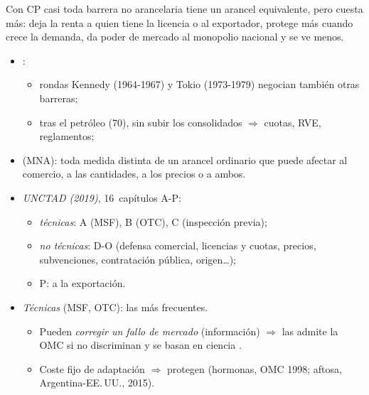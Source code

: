 \documentclass{article}
\begin{document}
\begin{columnas}
\begin{ideaclave}
Con CP casi toda barrera no arancelaria tiene un arancel equivalente, pero cuesta más: deja la renta a quien tiene la licencia o al exportador, protege más cuando crece la demanda, da poder de mercado al monopolio nacional y se ve menos.
\end{ideaclave}
\begin{itemize}
\item {}:
  \begin{itemize}
  \item rondas Kennedy (1964-1967) y Tokio (1973-1979) negocian también otras barreras;
  \item tras el petróleo (70), sin subir los consolidados $\Rightarrow$ cuotas, RVE, reglamentos;
  \end{itemize}
\item {} (MNA): toda medida distinta de un arancel ordinario que puede afectar al comercio, a las cantidades, a los precios o a ambos.
\item \emph{UNCTAD (2019)}, 16~capítulos A-P:
  \begin{itemize}
  \item \emph{técnicas}: A (MSF), B (OTC), C (inspección previa);
  \item \emph{no técnicas}: D-O (defensa comercial, licencias y cuotas, precios, subvenciones, contratación pública, origen…);
  \item P: a la exportación.
  \end{itemize}
\item \emph{Técnicas} (MSF, OTC): las más frecuentes.
  \begin{itemize}
  \item Pueden \emph{corregir un fallo de mercado} (información) $\Rightarrow$ las admite la OMC si no discriminan y se basan en ciencia .
  \item Coste fijo de adaptación $\Rightarrow$ protegen (hormonas, OMC 1998; aftosa, Argentina-EE.\,UU., 2015).
  \end{itemize}
\end{itemize}


\end{columnas}
\end{document}

